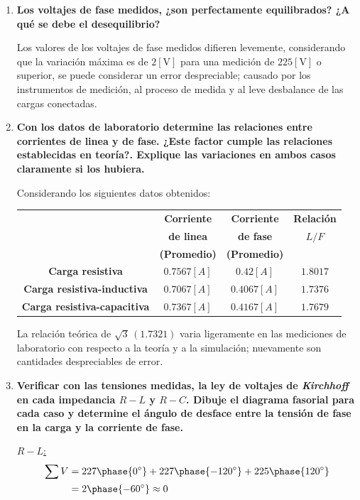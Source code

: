 \documentclass[letter,11pt]{article}
\begin{document}
\begin{enumerate}

\item \textbf{Los voltajes de fase medidos, ¿son perfectamente equilibrados? ¿A
qué se debe el desequilibrio?}

Los valores de los voltajes de fase medidos difieren levemente, considerando que
la variación máxima es de $2 [\text{V}]$ para una medición de $225 [\text{V}]$ o
superior, se puede considerar un error despreciable; causado por los
instrumentos de medición, al proceso de medida y al leve desbalance de las
cargas conectadas.

\item \textbf{Con los datos de laboratorio determine las relaciones entre
corrientes de linea y de fase. ¿Este factor cumple las relaciones establecidas
en teoría?. Explique las variaciones en ambos casos claramente si los hubiera.}

Considerando los siguientes datos obtenidos:
\begin{center}
    \begin{tabular}{|c||c|c||c|}
    \hline
    & \textbf{Corriente} & \textbf{Corriente} & \textbf{Relación}
    \tabularnewline
    & \textbf{de linea} & \textbf{de fase} & \textbf{$L/F$}
    \tabularnewline
    & \textbf{(Promedio)} & \textbf{(Promedio)} & 
    \tabularnewline \hline \hline
    \textbf{Carga resistiva} & $0.7567[A]$ & $0.42[A]$ & $1.8017$
    \tabularnewline \hline
    \textbf{Carga resistiva-inductiva} & $0.7067[A]$ & $0.4067[A]$ & $1.7376$
    \tabularnewline \hline
    \textbf{Carga resistiva-capacitiva} & $0.7367[A]$ & $0.4167[A]$ & $1.7679$
    \tabularnewline \hline
    \end{tabular}
\end{center}

La relación teórica de $\sqrt{3}\,(1.7321)$ varia ligeramente en las mediciones
de laboratorio con respecto a la teoría y a la simulación; nuevamente son
cantidades despreciables de error.

\item \textbf{Verificar con las tensiones medidas, la ley de voltajes de
\emph{Kirchhoff} en cada impedancia $R-L$ y $R-C$. Dibuje el diagrama fasorial
para cada caso y determine el ángulo de desface entre la tensión de fase en la
carga y la corriente de fase.}

\underline{$R-L$:}
\begin{equation*}
    \begin{split}
        \sum V &= 227\phase{0^{\circ}}+227\phase{-120^{\circ}}+225\phase{120^{\circ}}\\
               &= 2\phase{-60^{\circ}} \approx 0
    \end{split}
\end{equation*}


\end{enumerate}
\end{document}
